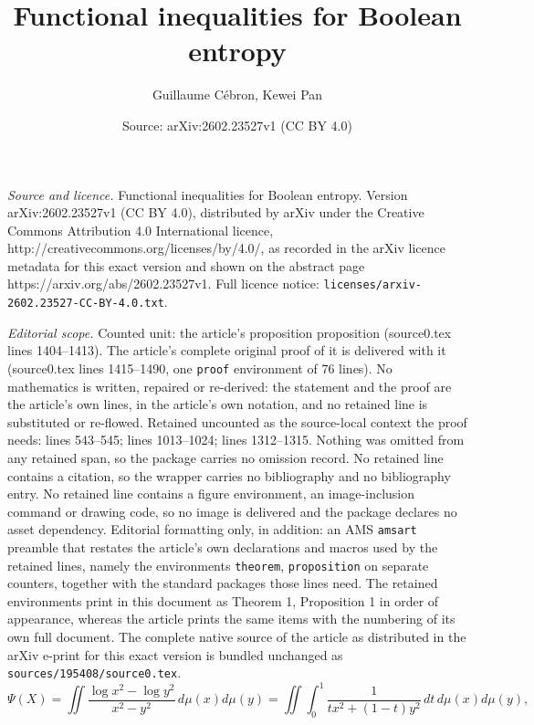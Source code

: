 \documentclass[10pt,a4paper]{amsart}
\title{Functional inequalities for Boolean entropy}
\author{Guillaume C\'ebron, Kewei Pan}
\date{Source: arXiv:2602.23527v1 (CC BY 4.0)}
\begin{document}
\maketitle

\noindent\emph{Source and licence.} Functional inequalities for Boolean entropy. Version arXiv:2602.23527v1 (CC BY 4.0), distributed by arXiv under the Creative Commons Attribution 4.0 International licence, http://creativecommons.org/licenses/by/4.0/, as recorded in the arXiv licence metadata for this exact version and shown on the abstract page https://arxiv.org/abs/2602.23527v1. Full licence notice: \texttt{licenses/arxiv-2602.23527-CC-BY-4.0.txt}.\par\smallskip

\noindent\textit{Editorial scope.} Counted unit: the article's proposition proposition (source0.tex lines 1404--1413). The article's complete original proof of it is delivered with it (source0.tex lines 1415--1490, one \texttt{proof} environment of 76 lines). No mathematics is written, repaired or re-derived: the statement and the proof are the article's own lines, in the article's own notation, and no retained line is substituted or re-flowed.  Retained uncounted as the source-local context the proof needs: lines 543--545; lines 1013--1024; lines 1312--1315.  Nothing was omitted from any retained span, so the package carries no omission record.  No retained line contains a citation, so the wrapper carries no bibliography and no bibliography entry.  No retained line contains a figure environment, an image-inclusion command or drawing code, so no image is delivered and the package declares no asset dependency.  Editorial formatting only, in addition: an AMS \texttt{amsart} preamble that restates the article's own declarations and macros used by the retained lines, namely the environments \texttt{theorem}, \texttt{proposition} on separate counters, together with the standard packages those lines need.  The retained environments print in this document as Theorem 1, Proposition 1 in order of appearance, whereas the article prints the same items with the numbering of its own full document.  The complete native source of the article as distributed in the arXiv e-print for this exact version is bundled unchanged as \texttt{sources/195408/source0.tex}.
		\begin{equation}\label{eq:fisher_0^1}
			\Psi(X) = \iint \frac{\log x^2-\log y^2}{x^2-y^2}\,d\mu(x)d\mu(y) = \iint \int_0^1 \frac{1}{tx^2 + (1-t)y^2}\,dt\,d\mu(x)d\mu(y),
		\end{equation}
\end{document}

